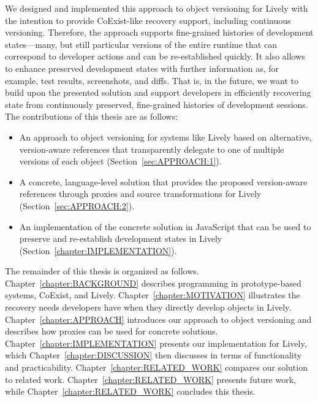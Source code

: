We designed and implemented this approach to object versioning for Lively with the intention to provide CoExist-like recovery support, including continuous versioning.
Therefore, the approach supports fine-grained histories of development states---many, but still particular versions of the entire runtime that can correspond to developer actions and can be re-established quickly.
It also allows to enhance preserved development states with further information as, for example, test results, screenshots, and diffs.
That is, in the future, we want to build upon the presented solution and support developers in efficiently recovering state from continuously preserved, fine-grained histories of development sessions.\\

The contributions of this thesis are as follows:
\begin{itemize}
    \item An approach to object versioning for systems like Lively based on alternative, version-aware references that transparently delegate to one of multiple versions of each object (Section~\ref{sec:APPROACH:1}).
    \item A concrete, language-level solution that provides the proposed version-aware references through proxies and source transformations for Lively (Section~\ref{sec:APPROACH:2}).
    \item An implementation of the concrete solution in JavaScript that can be used to preserve and re-establish development states in Lively (Section~\ref{chapter:IMPLEMENTATION}).\\
\end{itemize}

The remainder of this thesis is organized as follows. 
Chapter~\ref{chapter:BACKGROUND} describes programming in prototype-based systems, CoExist, and Lively.
Chapter~\ref{chapter:MOTIVATION} illustrates the recovery needs developers have when they directly develop objects in Lively.
Chapter~\ref{chapter:APPROACH} introduces our approach to object versioning and describes how proxies can be used for concrete solutions.
Chapter~\ref{chapter:IMPLEMENTATION} presents our implementation for Lively, which Chapter~\ref{chapter:DISCUSSION} then discusses in terms of functionality and practicability.
Chapter~\ref{chapter:RELATED_WORK} compares our solution to related work.
Chapter~\ref{chapter:RELATED_WORK} presents future work, while Chapter~\ref{chapter:RELATED_WORK} concludes this thesis.


